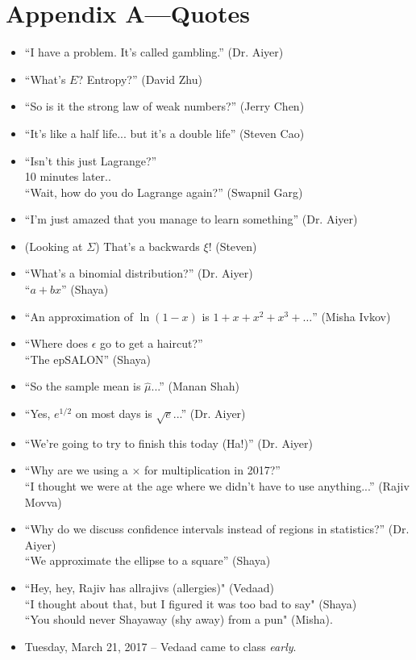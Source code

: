 \documentclass[11pt]{article}
\theoremstyle{definition}
\begin{document}
\section*{Appendix A---Quotes}
\begin{itemize}
\item ``I have a problem. It's called gambling.'' (Dr. Aiyer)
\item ``What's $E$? Entropy?'' (David Zhu)
\item ``So is it the strong law of weak numbers?'' (Jerry Chen)
\item ``It's like a half life... but it's a double life'' (Steven Cao)
\item ``Isn't this just Lagrange?''  \\ 10 minutes later.. \\ ``Wait, how do you do Lagrange again?'' (Swapnil Garg)
\item ``I'm just amazed that you manage to learn something'' (Dr. Aiyer)
\item (Looking at $\Sigma$) That's a backwards $\xi$! (Steven)
\item ``What's a binomial distribution?'' (Dr. Aiyer) \\ ``$a + bx$'' (Shaya)
\item ``An approximation of $\ln(1-x)$ is $1 + x + x^2 + x^3 + \dots$'' (Misha Ivkov)
\item ``Where does $\epsilon$ go to get a haircut?'' \\ ``The epSALON'' (Shaya)
\item ``So the sample mean is $\hat{\mu}$...'' (Manan Shah)
\item ``Yes, $e^{1/2}$ on most days is $\sqrt{e}$...'' (Dr. Aiyer)
\item ``We're going to try to finish this today (Ha!)'' (Dr. Aiyer)
\item ``Why are we using a $\times$ for multiplication in 2017?'' \\ ``I thought we were at the age where we didn't have to use anything...'' (Rajiv Movva)
\item ``Why do we discuss confidence intervals instead of regions in statistics?'' (Dr. Aiyer) \\ ``We approximate the ellipse to a square'' (Shaya)
\item ``Hey, hey, Rajiv has allrajivs (allergies)" (Vedaad) \\ 	``I thought about that, but I figured it was too bad to say" (Shaya) \\ ``You should never Shayaway (shy away) from a pun" (Misha).
\item Tuesday, March 21, 2017 -- Vedaad came to class \textit{early}.
\end{itemize}
\end{document}
